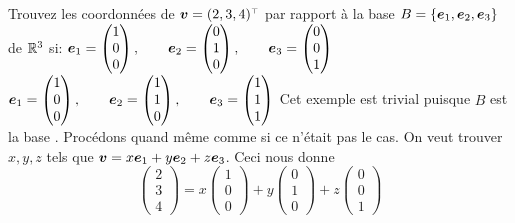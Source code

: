 \begin{exemple}
 Trouvez les coordonnées de $\mat{v} = \transp{(2, 3, 4)} $ par rapport à la base $B = \{ \boldsymbol{e}_1, \boldsymbol{e}_2, \boldsymbol{e}_3\}$ de
$\mathbb{R}^3$ si:
 $\displaystyle
\boldsymbol{e}_1 = \begin{pmatrix}
1\\0\\0
\end{pmatrix}, \qquad
\boldsymbol{e}_2 = \begin{pmatrix}
0\\1\\0
\end{pmatrix}, \qquad
\boldsymbol{e}_3 = \begin{pmatrix}
0\\0\\1
\end{pmatrix}
$
$\displaystyle
\boldsymbol{e}_1 = \begin{pmatrix}
1\\0\\0
\end{pmatrix}, \qquad
\boldsymbol{e}_2 = \begin{pmatrix}
1\\1\\0
\end{pmatrix}, \qquad
\boldsymbol{e}_3 = \begin{pmatrix}
1\\1\\1
\end{pmatrix}
$
\solution
{}  Cet exemple est trivial puisque $B$ est la base . 
Procédons quand même comme si ce n'était pas le cas.
 On veut trouver $x, y, z$ tels que $\boldsymbol{v} = x\boldsymbol{e}_1 + y\boldsymbol{e}_2 + z\boldsymbol{e}_3$.  
 Ceci nous donne
\[
\begin{pmatrix}
2\\
3\\
4
\end{pmatrix}
=
x\begin{pmatrix}
1\\0\\0
\end{pmatrix}
+ 
y\begin{pmatrix}
0\\1\\0
\end{pmatrix}
+ z \begin{pmatrix}
0 \\0 \\1
\end{pmatrix}
\]
\end{exemple}
